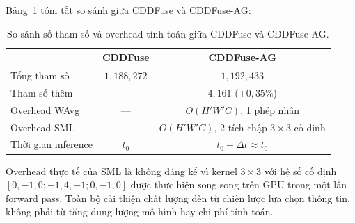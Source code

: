 Bảng~\ref{tab:complexity} tóm tắt so sánh giữa CDDFuse và CDDFuse-AG:

\begin{table}[H]
\centering
\small
\caption{So sánh số tham số và overhead tính toán giữa CDDFuse và CDDFuse-AG.}
\label{tab:complexity}
\setlength{\tabcolsep}{10pt}
\begin{tabular}{lcc}
\toprule
& CDDFuse & CDDFuse-AG \\
\midrule
Tổng tham số & $1{,}188{,}272$ & $1{,}192{,}433$ \\
Tham số thêm & --- & $4{,}161$ ($+0{,}35\%$) \\
Overhead WAvg & --- & $O(H'W'C)$, 1 phép nhân \\
Overhead SML & --- & $O(H'W'C)$, 2 tích chập $3{\times}3$ cố định \\
Thời gian inference & $t_0$ & $t_0 + \Delta t \approx t_0$ \\
\bottomrule
\end{tabular}
\end{table}

Overhead thực tế của SML là không đáng kể vì kernel $3\times3$ với hệ số cố định $[0, -1, 0; -1, 4, -1; 0, -1, 0]$ được thực hiện song song trên GPU trong một lần forward pass. Toàn bộ cải thiện chất lượng đến từ chiến lược lựa chọn thông tin, không phải từ tăng dung lượng mô hình hay chi phí tính toán.
